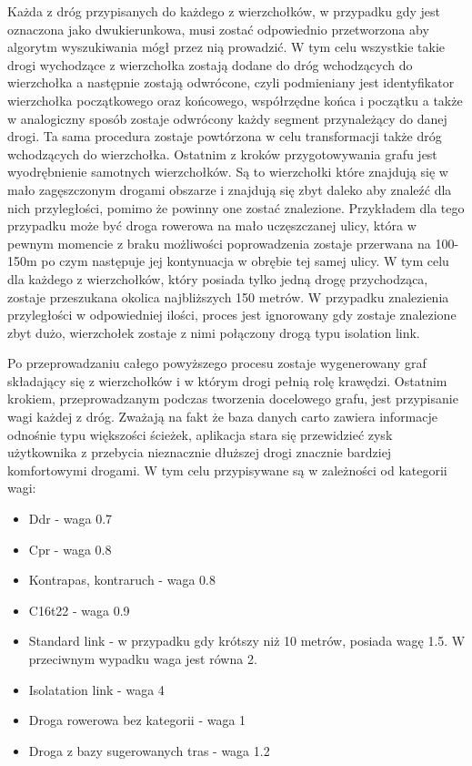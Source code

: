 Każda z dróg przypisanych do każdego z wierzchołków, w przypadku gdy jest oznaczona jako dwukierunkowa, musi zostać odpowiednio przetworzona aby algorytm wyszukiwania mógł przez nią prowadzić. W tym celu wszystkie takie drogi wychodzące z wierzchołka zostają dodane do dróg wchodzących do wierzchołka a następnie zostają odwrócone, czyli podmieniany jest identyfikator wierzchołka początkowego oraz końcowego, współrzędne końca i początku a także w analogiczny sposób zostaje odwrócony każdy segment przynależący do danej drogi. Ta sama procedura zostaje powtórzona w celu transformacji także dróg wchodzących do wierzchołka.
Ostatnim z kroków przygotowywania grafu jest wyodrębnienie samotnych wierzchołków. Są to wierzchołki które znajdują się w mało zagęszczonym drogami obszarze i znajdują się zbyt daleko aby znaleźć dla nich przyległości, pomimo że powinny one zostać znalezione. Przykładem dla tego przypadku może być droga rowerowa na mało uczęszczanej ulicy, która w pewnym momencie z braku możliwości poprowadzenia zostaje przerwana na 100-150m po czym następuje jej kontynuacja w obrębie tej samej ulicy. W tym celu dla każdego z wierzchołków, który posiada tylko jedną drogę przychodząca, zostaje przeszukana okolica najbliższych 150 metrów. W przypadku znalezienia przyległości w odpowiedniej ilości, proces jest ignorowany gdy zostaje znalezione zbyt dużo, wierzchołek zostaje z nimi połączony drogą typu isolation link.

Po przeprowadzaniu całego powyższego procesu zostaje wygenerowany graf składający się z wierzchołków i w którym drogi pełnią rolę krawędzi. Ostatnim krokiem, przeprowadzanym podczas tworzenia docelowego grafu, jest przypisanie wagi każdej z dróg. Zważają na fakt że baza danych carto zawiera informacje odnośnie typu większości ścieżek, aplikacja stara się przewidzieć zysk użytkownika z przebycia nieznacznie dłuższej drogi znacznie bardziej komfortowymi drogami. W tym celu przypisywane są w zależności od kategorii wagi:

\begin{itemize}
\item Ddr - waga 0.7
\item Cpr - waga 0.8
\item Kontrapas, kontraruch - waga 0.8
\item C16t22 - waga 0.9
\item Standard link - w przypadku gdy krótszy niż 10 metrów, posiada wagę 1.5. W przeciwnym wypadku waga jest równa 2.
\item Isolatation link - waga 4
\item Droga rowerowa bez kategorii - waga 1
\item Droga z bazy sugerowanych tras - waga 1.2
\end{itemize}


